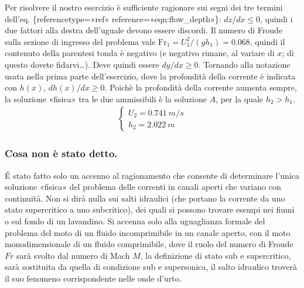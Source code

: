 \documentclass[letterpaper,10pt,italian]{jupyterBook}
\begin{document}
\sphinxAtStartPar
Per risolvere il nostro esercizio è sufficiente ragionare sui segni dei
tre termini dell’eq.
\{reference\sphinxhyphen{}type=»ref»
reference=»eqn:flow\_depth»\}: \(dz/dx \le 0\), quindi i due fattori alla
destra dell’uguale devono essere discordi. Il numero di Froude sulla
sezione di ingresso del problema vale
\(\text{Fr}_1 = U^2_1 / (g h_1) = 0.068\), quindi il contenuto della
parentesi tonda è negativo (e negativo rimane, al variare di \(x\); di
questo dovete fidarvi…). Deve quindi essere \(dy/dx \ge 0\). Tornando
alla notazione usata nella prima parte dell’esercizio, dove la
profondità della corrente è indicata con \(h(x)\), \(dh(x)/dx \ge 0\).
Poichè la profondità della corrente aumenta sempre, la soluzione
«fisica» tra le due ammissibili è la soluzione \(A\), per la quale
\(h_2 > h_1\).
\begin{equation*}
\begin{split}\begin{cases}
   U_2 = 0.741 \ m/s \\
   h_2 = 2.022 \ m
  \end{cases}\end{split}
\end{equation*}

\subsubsection{Cosa non è stato detto.}
\label{\detokenize{polimi/fluidmechanics-ita/template/capitoli/05_bernoulli/0502in:cosa-non-e-stato-detto}}
\sphinxAtStartPar
É stato fatto solo un accenno al ragionamento che consente di
determinare l’unica soluzione «fisica» del problema delle correnti in
canali aperti che variano con continuità. Non si dirà nulla sui salti
idraulici (che portano la corrente da uno stato supercritico a uno
subcritico), dei quali si possono trovare esempi nei fiumi o sul fondo
di un lavandino. Si accenna solo alla uguaglianza formale del problema
del moto di un fluido incomprimibile in un canale aperto, con il moto
monodimensionale di un fluido comprimibile, dove il ruolo del numero di
Froude \(\textit{Fr}\) sarà svolto dal numero di Mach \(M\), la definizione
di stato sub\sphinxhyphen{} e supercritico, sarà sostituita da quella di condizione
sub\sphinxhyphen{} e supersonica, il salto idraulico troverà il suo fenomeno
corrispondente nelle onde d’urto.

\sphinxstepscope
\end{document}
